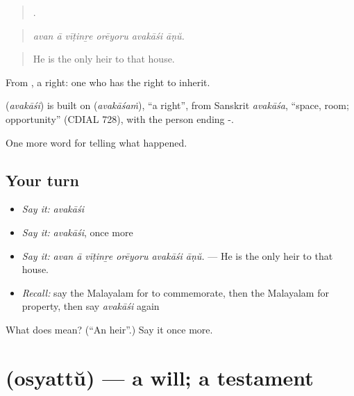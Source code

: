 \begin{quote}
     .
\end{quote}

\begin{quote}
\emph{avan ā vīṭinṟe orēyoru avakāśi āṇŭ.}
\end{quote}

\begin{quote}
He is the only heir to that house.
\end{quote}

From , a right: one who has the right to inherit.

\begin{cousinweb}
\textbf{} (\emph{avakāśi}) is built on  (\emph{avakāśaṁ}), \textquotedblleft{}a right\textquotedblright{}, from Sanskrit \emph{avakāśa}, \textquotedblleft{}space, room; opportunity\textquotedblright{} (CDIAL 728), with the person ending -.
\end{cousinweb}

\begin{grammarlens}[title={What you've built}]
One more word for telling what happened.
\end{grammarlens}

\subsection*{Your turn}
\begin{itemize}
\raggedright
  \item \emph{Say it:} \emph{avakāśi}
  \item \emph{Say it:} \emph{avakāśi}, once more
  \item \emph{Say it:} \emph{avan ā vīṭinṟe orēyoru avakāśi āṇŭ.} — He is the only heir to that house.
  \item \emph{Recall:} say the Malayalam for to commemorate, then the Malayalam for property, then say \emph{avakāśi} again
\end{itemize}

\begin{tcolorbox}[breakable,colback=teal!4,colframe=teal!35!black,title={Before you move on}]
What does  mean? (\textquotedblleft{}An heir\textquotedblright{}.) Say it once more.
\end{tcolorbox}
\section[\texorpdfstring{\ml{ഒസ്യത്ത്} (osyattŭ)}{ഒസ്യത്ത് (osyattŭ)}]{ (osyattŭ) — a will; a testament}

